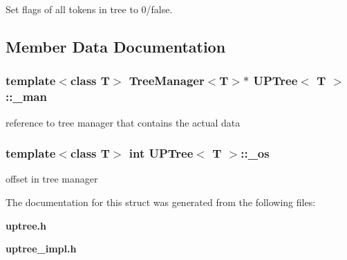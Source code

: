 Set flags of all tokens in tree to 0/false. 



\subsection{Member Data Documentation}
\subsubsection{\setlength{\rightskip}{0pt plus 5cm}template$<$class T$>$ {\bf Tree\-Manager}$<$T$>$$\ast$ {\bf UPTree}$<$ T $>$::{\bf \_\-man}}\label{structUPTree_o1}


reference to tree manager that contains the actual data 

\subsubsection{\setlength{\rightskip}{0pt plus 5cm}template$<$class T$>$ int {\bf UPTree}$<$ T $>$::{\bf \_\-os}}\label{structUPTree_o0}


offset in tree manager 



The documentation for this struct was generated from the following files:\begin{CompactItemize}
\item 
{\bf uptree.h}\item 
{\bf uptree\_\-impl.h}\end{CompactItemize}
